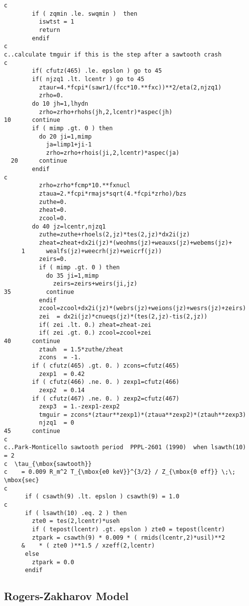 \begin{verbatim}
c
        if ( zqmin .le. swqmin )  then
          iswtst = 1
          return
        endif
c
c..calculate tmguir if this is the step after a sawtooth crash
c
        if( cfutz(465) .le. epslon ) go to 45
        if( njzq1 .lt. lcentr ) go to 45
          ztaur=4.*fcpi*(sawr1/(fcc*10.**fxc))**2/eta(2,njzq1)
          zrho=0.
        do 10 jh=1,lhydn
          zrho=zrho+rhohs(jh,2,lcentr)*aspec(jh)
10      continue
        if ( mimp .gt. 0 ) then
          do 20 ji=1,mimp
            ja=limp1+ji-1
            zrho=zrho+rhois(ji,2,lcentr)*aspec(ja)
  20      continue
        endif
c
          zrho=zrho*fcmp*10.**fxnucl
          ztaua=2.*fcpi*rmajs*sqrt(4.*fcpi*zrho)/bzs
          zuthe=0.
          zheat=0.
          zcool=0.
        do 40 jz=lcentr,njzq1
          zuthe=zuthe+rhoels(2,jz)*tes(2,jz)*dx2i(jz)
          zheat=zheat+dx2i(jz)*(weohms(jz)+weauxs(jz)+webems(jz)+
     1      wealfs(jz)+weecrh(jz)+weicrf(jz))
          zeirs=0.
          if ( mimp .gt. 0 ) then
            do 35 ji=1,mimp
              zeirs=zeirs+weirs(ji,jz)
35          continue
          endif
          zcool=zcool+dx2i(jz)*(webrs(jz)+weions(jz)+wesrs(jz)+zeirs)
          zei  = dx2i(jz)*cnueqs(jz)*(tes(2,jz)-tis(2,jz))
          if( zei .lt. 0.) zheat=zheat-zei
          if( zei .gt. 0.) zcool=zcool+zei
40      continue
          ztauh  = 1.5*zuthe/zheat
          zcons  = -1.
        if ( cfutz(465) .gt. 0. ) zcons=cfutz(465)
          zexp1  = 0.42
        if ( cfutz(466) .ne. 0. ) zexp1=cfutz(466)
          zexp2  = 0.14
        if ( cfutz(467) .ne. 0. ) zexp2=cfutz(467)
          zexp3  = 1.-zexp1-zexp2
          tmguir = zcons*(ztaur**zexp1)*(ztaua**zexp2)*(ztauh**zexp3)
          njzq1  = 0
45      continue
c
c..Park-Monticello sawtooth period  PPPL-2601 (1990)  when lsawth(10) = 2
c  \tau_{\mbox{sawtooth}}
c    = 0.009 R_m^2 T_{\mbox{e0 keV}}^{3/2} / Z_{\mbox{0 eff}} \;\; \mbox{sec}
c
      if ( csawth(9) .lt. epslon ) csawth(9) = 1.0
c
      if ( lsawth(10) .eq. 2 ) then
        zte0 = tes(2,lcentr)*useh 
        if ( tepost(lcentr) .gt. epslon ) zte0 = tepost(lcentr)
        ztpark = csawth(9) * 0.009 * ( rmids(lcentr,2)*usil)**2
     &    * ( zte0 )**1.5 / xzeff(2,lcentr)
      else
        ztpark = 0.0
      endif
\end{verbatim}

\subsection{Rogers-Zakharov Model}

